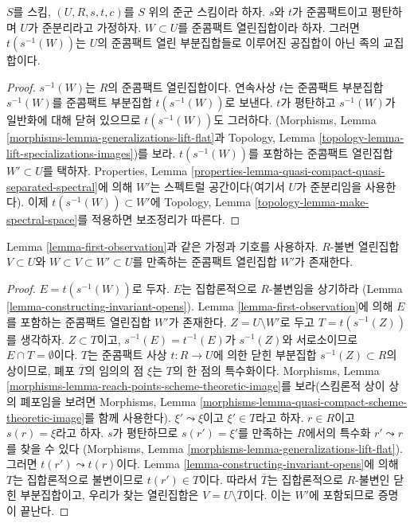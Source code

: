 \begin{lemma}
\label{lemma-first-observation}
$S$를 스킴, $(U, R, s, t, c)$를 $S$ 위의 준군 스킴이라 하자. $s$와 $t$가 준콤팩트이고 평탄하며 $U$가
준분리라고 가정하자. $W \subset U$를 준콤팩트 열린집합이라 하자. 그러면 $t(s^{-1}(W))$는 $U$의 준콤팩트
열린 부분집합들로 이루어진 공집합이 아닌 족의 교집합이다.
\end{lemma}

\begin{proof}
$s^{-1}(W)$는 $R$의 준콤팩트 열린집합이다. 연속사상 $t$는 준콤팩트 부분집합 $s^{-1}(W)$를 준콤팩트 부분집합
$t(s^{-1}(W))$로 보낸다. $t$가 평탄하고 $s^{-1}(W)$가 일반화에 대해 닫혀 있으므로 $t(s^{-1}(W))$도 그러하다.
(Morphisms, Lemma \ref{morphisms-lemma-generalizations-lift-flat}과
Topology, Lemma \ref{topology-lemma-lift-specializations-images})를 보라. $t(s^{-1}(W))$를 포함하는 준콤팩트 열린집합
$W' \subset U$를 택하자. Properties, Lemma \ref{properties-lemma-quasi-compact-quasi-separated-spectral}에 의해
$W'$는 스펙트럴 공간이다(여기서 $U$가 준분리임을 사용한다). 이제 $t(s^{-1}(W)) \subset W'$에
Topology, Lemma \ref{topology-lemma-make-spectral-space}를 적용하면 보조정리가 따른다.
\end{proof}

\begin{lemma}
\label{lemma-second-observation}
Lemma \ref{lemma-first-observation}과 같은 가정과 기호를 사용하자. $R$-불변 열린집합 $V \subset U$와
$W \subset V \subset W' \subset U$를 만족하는 준콤팩트 열린집합 $W'$가 존재한다.
\end{lemma}

\begin{proof}
$E = t(s^{-1}(W))$로 두자. $E$는 집합론적으로 $R$-불변임을 상기하라
(Lemma \ref{lemma-constructing-invariant-opens}). Lemma \ref{lemma-first-observation}에 의해 $E$를 포함하는
준콤팩트 열린집합 $W'$가 존재한다. $Z = U \setminus W'$로 두고 $T = t(s^{-1}(Z))$를 생각하자.
$Z \subset T$이고, $s^{-1}(E) = t^{-1}(E)$가 $s^{-1}(Z)$와 서로소이므로 $E \cap T = \emptyset$이다.
$T$는 준콤팩트 사상 $t : R \to U$에 의한 닫힌 부분집합 $s^{-1}(Z) \subset R$의 상이므로, 폐포
$\overline{T}$의 임의의 점 $\xi$는 $T$의 한 점의 특수화이다. Morphisms, Lemma
\ref{morphisms-lemma-reach-points-scheme-theoretic-image}를 보라(스킴론적 상이 상의 폐포임을 보려면 Morphisms, Lemma
\ref{morphisms-lemma-quasi-compact-scheme-theoretic-image}를 함께 사용한다). $\xi' \leadsto \xi$이고
$\xi' \in T$라고 하자. $r \in R$이고 $s(r) = \xi$라고 하자. $s$가 평탄하므로 $s(r') = \xi'$를 만족하는
$R$에서의 특수화 $r' \leadsto r$를 찾을 수 있다
(Morphisms, Lemma \ref{morphisms-lemma-generalizations-lift-flat}). 그러면 $t(r') \leadsto t(r)$이다.
Lemma \ref{lemma-constructing-invariant-opens}에 의해 $T$는 집합론적으로 불변이므로 $t(r') \in T$이다.
따라서 $\overline{T}$는 집합론적으로 $R$-불변인 닫힌 부분집합이고, 우리가 찾는 열린집합은
$V = U \setminus \overline{T}$이다. 이는 $W'$에 포함되므로 증명이 끝난다.
\end{proof}




